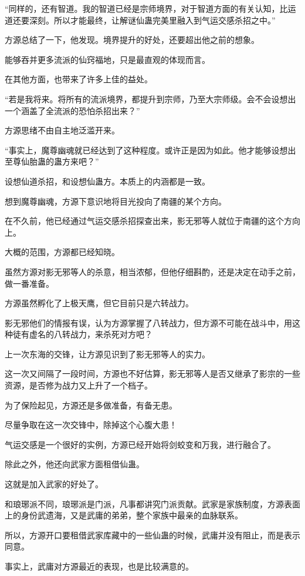 \begin{this_body}
“同样的，还有智道。我的智道已经是宗师境界，对于智道方面的有关认知，比运道还要深刻。所以才能最终，让解谜仙蛊完美里融入到气运交感杀招之中。”

方源总结了一下，他发现。境界提升的好处，还要超出他之前的想象。

能够吞并更多流派的仙窍福地，只是最直观的体现而言。

在其他方面，也带来了许多上佳的益处。

“若是我将来。将所有的流派境界，都提升到宗师，乃至大宗师级。会不会设想出一个涵盖了全流派的恐怕杀招出来？”

方源思绪不由自主地泛滥开来。

“事实上，魔尊幽魂就已经达到了这种程度。或许正是因为如此。他才能够设想出至尊仙胎蛊的蛊方来吧？”

设想仙道杀招，和设想仙蛊方。本质上的内涵都是一致。

想到魔尊幽魂，方源下意识地将目光投向了南疆的某个方向。

在不久前，他已经通过气运交感杀招探查出来，影无邪等人就位于南疆的这个方向上。

大概的范围，方源都已经知晓。

虽然方源对影无邪等人的杀意，相当浓郁，但他仔细斟酌，还是决定在动手之前，做一番准备。

方源虽然孵化了上极天鹰，但它目前只是六转战力。

影无邪他们的情报有误，认为方源掌握了八转战力，但方源不可能在战斗中，用这种徒有虚名的八转战力，来杀死对方吧？

上一次东海的交锋，让方源见识到了影无邪等人的实力。

这一次又间隔了一段时间，方源也不好估算，影无邪等人是否又继承了影宗的一些资源，是否修为战力又上升了一个档子。

为了保险起见，方源还是多做准备，有备无患。

尽量争取在这一次交锋中，除掉这个心腹大患！

气运交感是一个很好的实例，方源已经开始将剑蛟变和万我，进行融合了。

除此之外，他还向武家方面租借仙蛊。

这就是加入武家的好处了。

和琅琊派不同，琅琊派是门派，凡事都讲究门派贡献。武家是家族制度，方源表面上的身份武遗海，又是武庸的弟弟，整个家族中最亲的血脉联系。

所以，方源开口要租借武家库藏中的一些仙蛊的时候，武庸并没有阻止，而是表示同意。

事实上，武庸对方源最近的表现，也是比较满意的。


\end{this_body}
